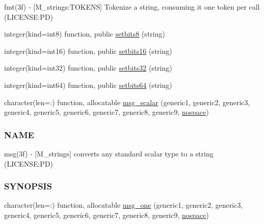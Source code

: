 \begin{DoxyCompactItemize}
\begin{DoxyCompactList}
fmt(3f) -\/ \mbox{[}M\+\_\+strings\+:T\+O\+K\+E\+NS\mbox{]} Tokenize a string, consuming it one token per call (L\+I\+C\+E\+N\+SE\+:PD) \end{DoxyCompactList}\item 
integer(kind=int8) function, public \mbox{\hyperlink{namespacem__strings_acc1854720186b8a5582a339d1cbb134b}{setbits8}} (string)
\item 
integer(kind=int16) function, public \mbox{\hyperlink{namespacem__strings_a536b90500130aa47bde4def7ecd5f6aa}{setbits16}} (string)
\item 
integer(kind=int32) function, public \mbox{\hyperlink{namespacem__strings_a44fd7db30f28fd30086eff1a59fbfa7e}{setbits32}} (string)
\item 
integer(kind=int64) function, public \mbox{\hyperlink{namespacem__strings_a3d005819ec07b086dbc6d1c197834142}{setbits64}} (string)
\item 
character(len=\+:) function, allocatable \mbox{\hyperlink{namespacem__strings_a926d1d9f529487149f4e0a1de8294122}{msg\+\_\+scalar}} (generic1, generic2, generic3, generic4, generic5, generic6, generic7, generic8, generic9, \mbox{\hyperlink{namespacem__strings_ad007f050abe3d142f4a7badbc4408685}{nospace}})
\begin{DoxyCompactList}\small\item\em \subsubsection*{N\+A\+ME}

msg(3f) -\/ \mbox{[}M\+\_\+strings\mbox{]} converts any standard scalar type to a string (L\+I\+C\+E\+N\+SE\+:PD) \subsubsection*{S\+Y\+N\+O\+P\+S\+IS}\end{DoxyCompactList}\item 
character(len=\+:) function, allocatable \mbox{\hyperlink{namespacem__strings_a52d27df9dcea52039c6feccb782ec4fd}{msg\+\_\+one}} (generic1, generic2, generic3, generic4, generic5, generic6, generic7, generic8, generic9, \mbox{\hyperlink{namespacem__strings_ad007f050abe3d142f4a7badbc4408685}{nospace}})
\end{DoxyCompactItemize}
